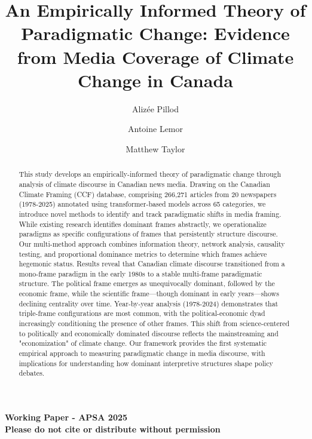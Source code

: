 \documentclass[12pt]{article}
\title{\textbf{An Empirically Informed Theory of Paradigmatic Change: Evidence from Media Coverage of Climate Change in Canada}}
\author[1]{Alizée Pillod}
\author[2]{Antoine Lemor}
\author[3]{Matthew Taylor}
\affil[1]{Université de Montréal}
\affil[2]{Université de Sherbrooke}
\affil[3]{Université de Montréal}
\date{}
\begin{document}
\maketitle
\thispagestyle{empty}

\vspace{-0.5em}
\begin{center}
\colorbox{gray!20}{\parbox{0.9\textwidth}{%
\centering\large\bfseries
Working Paper - APSA 2025\\[0.2em]
\normalsize Please do not cite or distribute without permission
}}
\end{center}

\vspace{0.3em}

\begin{abstract}
\noindent
This study develops an empirically-informed theory of paradigmatic change through analysis of climate discourse in Canadian news media. Drawing on the Canadian Climate Framing (CCF) database, comprising 266,271 articles from 20 newspapers (1978-2025) annotated using transformer-based models across 65 categories, we introduce novel methods to identify and track paradigmatic shifts in media framing. While existing research identifies dominant frames abstractly, we operationalize paradigms as specific configurations of frames that persistently structure discourse. Our multi-method approach combines information theory, network analysis, causality testing, and proportional dominance metrics to determine which frames achieve hegemonic status. Results reveal that Canadian climate discourse transitioned from a mono-frame paradigm in the early 1980s to a stable multi-frame paradigmatic structure. The political frame emerges as unequivocally dominant, followed by the economic frame, while the scientific frame—though dominant in early years—shows declining centrality over time. Year-by-year analysis (1978-2024) demonstrates that triple-frame configurations are most common, with the political-economic dyad increasingly conditioning the presence of other frames. This shift from science-centered to politically and economically dominated discourse reflects the mainstreaming and "economization" of climate change. Our framework provides the first systematic empirical approach to measuring paradigmatic change in media discourse, with implications for understanding how dominant interpretive structures shape policy debates.
\end{abstract}

\newpage
\end{document}
